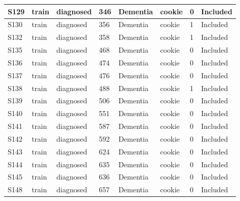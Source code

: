 \begin{center}
\begin{longtable}{|l|l|l|l|l|l|l|l|}
S129           & train                 & diagnosed         & 346     & Dementia       & cookie          & 0            & Included      \\ \hline
S130           & train                 & diagnosed         & 356     & Dementia       & cookie          & 1            & Included      \\ \hline
S132           & train                 & diagnosed         & 358     & Dementia       & cookie          & 1            & Included      \\ \hline
S135           & train                 & diagnosed         & 468     & Dementia       & cookie          & 0            & Included      \\ \hline
S136           & train                 & diagnosed         & 474     & Dementia       & cookie          & 0            & Included      \\ \hline
S137           & train                 & diagnosed         & 476     & Dementia       & cookie          & 0            & Included      \\ \hline
S138           & train                 & diagnosed         & 488     & Dementia       & cookie          & 1            & Included      \\ \hline
S139           & train                 & diagnosed         & 506     & Dementia       & cookie          & 0            & Included      \\ \hline
S140           & train                 & diagnosed         & 551     & Dementia       & cookie          & 0            & Included      \\ \hline
S141           & train                 & diagnosed         & 587     & Dementia       & cookie          & 0            & Included      \\ \hline
S142           & train                 & diagnosed         & 592     & Dementia       & cookie          & 0            & Included      \\ \hline
S143           & train                 & diagnosed         & 624     & Dementia       & cookie          & 0            & Included      \\ \hline
S144           & train                 & diagnosed         & 635     & Dementia       & cookie          & 0            & Included      \\ \hline
S145           & train                 & diagnosed         & 636     & Dementia       & cookie          & 0            & Included      \\ \hline
S148           & train                 & diagnosed         & 657     & Dementia       & cookie          & 0            & Included      \\ \hline

\end{longtable}
\end{center}
